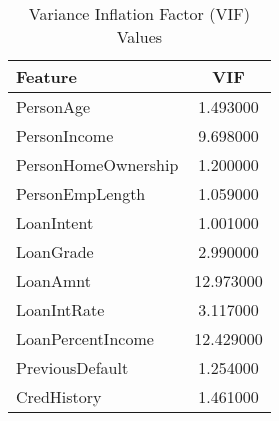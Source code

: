 \begin{table}[H]\centering
\caption{Variance Inflation Factor (VIF) Values}
\label{Table 4:vif_values}
\begin{tabular}{lc}
\toprule
Feature & VIF \\
\midrule
PersonAge & 1.493000 \\
PersonIncome & 9.698000 \\
PersonHomeOwnership & 1.200000 \\
PersonEmpLength & 1.059000 \\
LoanIntent & 1.001000 \\
LoanGrade & 2.990000 \\
LoanAmnt & 12.973000 \\
LoanIntRate & 3.117000 \\
LoanPercentIncome & 12.429000 \\
PreviousDefault & 1.254000 \\
CredHistory & 1.461000 \\
\bottomrule
\end{tabular}
\end{table}
